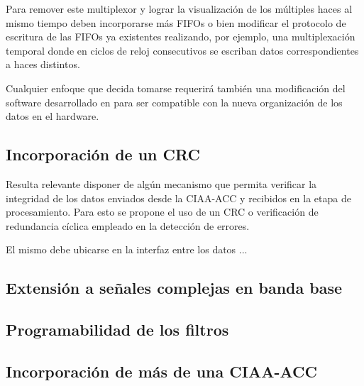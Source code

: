 \documentclass[../../main.tex]{subfiles}
\begin{document}
Para remover este multiplexor y lograr la visualización de los múltiples haces al mismo tiempo deben incorporarse más FIFOs o bien modificar el protocolo de escritura de las FIFOs ya existentes realizando, por ejemplo, una multiplexación temporal donde en ciclos de reloj consecutivos se escriban datos correspondientes a haces distintos.

Cualquier enfoque que decida tomarse requerirá también una modificación del software desarrollado en \cite{proyecto-jose} para ser compatible con la nueva organización de los datos en el hardware.

\subsection{Incorporación de un CRC}
Resulta relevante disponer de algún mecanismo que permita verificar la integridad de los datos enviados desde la CIAA-ACC y recibidos en la etapa de procesamiento. Para esto se propone el uso de un CRC o verificación de redundancia cíclica empleado en la detección de errores.

El mismo debe ubicarse en la interfaz entre los datos ...
\subsection{Extensión a señales complejas en banda base}
\subsection{Programabilidad de los filtros}
\subsection{Incorporación de más de una CIAA-ACC}

\end{document}
